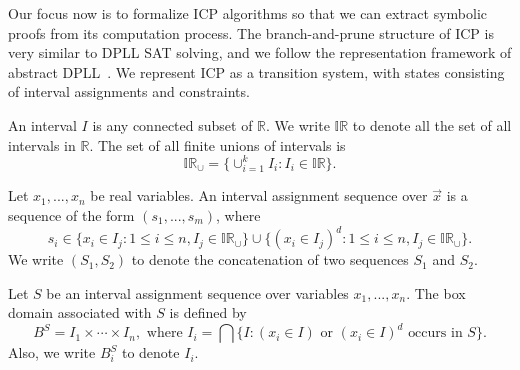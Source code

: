 \documentclass[envcountsect]{llncs}
\begin{document}
Our focus now is to formalize ICP algorithms so that we can extract symbolic proofs from
its computation process. The branch-and-prune structure of ICP is very similar
to DPLL SAT solving, and we follow the representation framework of abstract
DPLL~\cite{}. We represent ICP as a transition system, with states consisting of
interval assignments and constraints.
\begin{definition}[Intervals]
An interval $I$ is any connected subset of $\mathbb{R}$. We write $\mathbb{IR}$
to denote all the set of all intervals in $\mathbb{R}$. The set of all finite
unions of intervals is
$$\mathbb{IR}_{\cup} = \{\cup_{i=1}^k I_i: I_i\in\mathbb{IR}\}.$$
\end{definition}
\begin{definition}
Let $x_1,...,x_n$ be real variables. An interval assignment sequence over
$\vec x$ is a sequence of the form $(s_1,...,s_m)$, where
$$s_i\in \{x_i\in I_j: 1\leq i\leq n, I_j\in
\mathbb{IR}_{\cup}\}\cup\{(x_i\in I_j)^d: 1\leq i\leq n, I_j\in
\mathbb{IR}_{\cup}\}.
$$
We write $(S_1, S_2)$ to denote the concatenation of two sequences $S_1$ and
$S_2$.
\end{definition}
\begin{definition}
Let $S$ be an interval assignment sequence over variables $x_1,...,x_n$. The box
domain associated with $S$ is defined by
$$B^S = I_1\times\cdots \times I_n, \mbox{ where }I_i = \bigcap\{ I: (x_i\in
I)\mbox{ or } (x_i\in I)^d \mbox{ occurs in } S\}.$$
Also, we write $B^S_i$ to denote $I_i$.
\end{definition}
\end{document}
